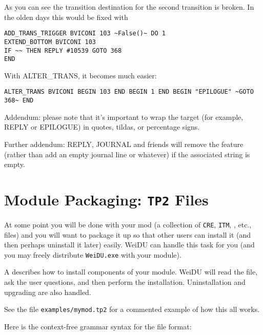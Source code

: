 \documentclass{article}
\def\ttref#1{\ahrefloc{#1}{\tt #1}}
\def\DEFINE#1{{\tt \bf #1}\label{#1}\index{#1}}
\def\t#1{{\tt #1}}
\begin{document}
As you can see the transition destination for the second transition is broken. In the olden days this would be fixed with

\begin{verbatim}
ADD_TRANS_TRIGGER BVICONI 103 ~False()~ DO 1
EXTEND_BOTTOM BVICONI 103
IF ~~ THEN REPLY #10539 GOTO 368
END
\end{verbatim}


With ALTER_TRANS, it becomes much easier:

\begin{verbatim}
ALTER_TRANS BVICONI BEGIN 103 END BEGIN 1 END BEGIN "EPILOGUE" ~GOTO 368~ END
\end{verbatim}

Addendum: please note that it's important to wrap the target (for example, REPLY or EPILOGUE)
in quotes, tildas, or percentage signs.

Further addendum: REPLY, JOURNAL and friends will remove the feature (rather than add an empty
journal line or whatever) if the associated string is empty.



\section{Module Packaging: \DEFINE{TP2} Files}
\label{TP}

At some point you will be done with your mod (a collection of \t{CRE},
\t{ITM}, \ttref{D}, etc., files) and you will want to package it up so that
other users can install it (and then perhaps uninstall it later) easily.
WeiDU can handle this task for you (and you may freely distribute \t{WeiDU.exe}
with your module).

A \ttref{TP2} describes how to install components of your module. WeiDU
will read the file, ask the user questions, and then perform the
installation. Uninstallation and upgrading are also handled.

See the file \t{examples/mymod.tp2} for a commented example of how this all
works.

Here is the context-free grammar syntax for the \ttref{TP2} file format:
\end{document}
